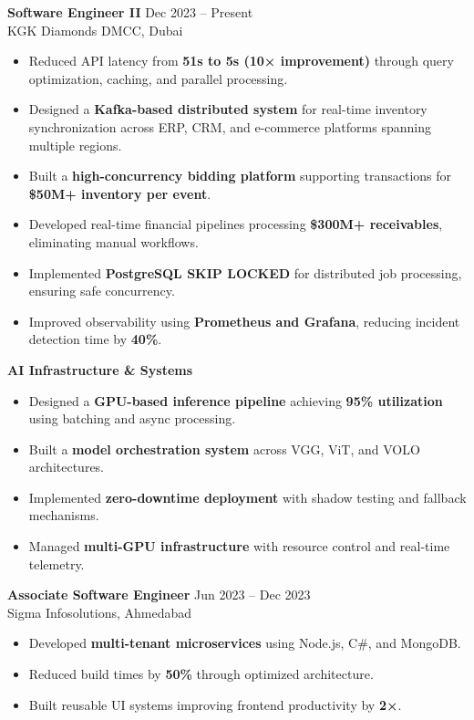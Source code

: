 \documentclass[a4paper,10pt]{article}
\begin{document}
\textbf{Software Engineer II} \hfill Dec 2023 -- Present \\
KGK Diamonds DMCC, Dubai
\begin{itemize}[leftmargin=*]
    \item Reduced API latency from \textbf{51s to 5s (10× improvement)} through query optimization, caching, and parallel processing.
    \item Designed a \textbf{Kafka-based distributed system} for real-time inventory synchronization across ERP, CRM, and e-commerce platforms spanning multiple regions.
    \item Built a \textbf{high-concurrency bidding platform} supporting transactions for \textbf{\$50M+ inventory per event}.
    \item Developed real-time financial pipelines processing \textbf{\$300M+ receivables}, eliminating manual workflows.
    \item Implemented \textbf{PostgreSQL SKIP LOCKED} for distributed job processing, ensuring safe concurrency.
    \item Improved observability using \textbf{Prometheus and Grafana}, reducing incident detection time by \textbf{40\%}.
\end{itemize}

\textbf{AI Infrastructure \& Systems}
\begin{itemize}[leftmargin=*]
    \item Designed a \textbf{GPU-based inference pipeline} achieving \textbf{95\% utilization} using batching and async processing.
    \item Built a \textbf{model orchestration system} across VGG, ViT, and VOLO architectures.
    \item Implemented \textbf{zero-downtime deployment} with shadow testing and fallback mechanisms.
    \item Managed \textbf{multi-GPU infrastructure} with resource control and real-time telemetry.
\end{itemize}

\textbf{Associate Software Engineer} \hfill Jun 2023 -- Dec 2023 \\
Sigma Infosolutions, Ahmedabad
\begin{itemize}[leftmargin=*]
    \item Developed \textbf{multi-tenant microservices} using Node.js, C\#, and MongoDB.
    \item Reduced build times by \textbf{50\%} through optimized architecture.
    \item Built reusable UI systems improving frontend productivity by \textbf{2×}.
\end{itemize}
\end{document}
